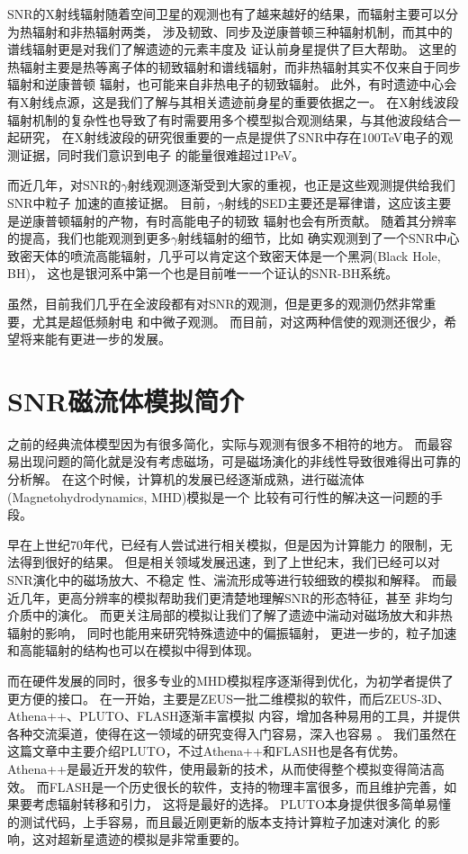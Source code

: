 SNR的X射线辐射随着空间卫星的观测也有了越来越好的结果，而辐射主要可以分为热辐射和非热辐射两类，
涉及韧致、同步及逆康普顿三种辐射机制，而其中的谱线辐射更是对我们了解遗迹的元素丰度及
证认前身星提供了巨大帮助。
这里的热辐射主要是热等离子体的韧致辐射和谱线辐射，而非热辐射其实不仅来自于同步辐射和逆康普顿
辐射，也可能来自非热电子的韧致辐射。
此外，有时遗迹中心会有X射线点源，这是我们了解与其相关遗迹前身星的重要依据之一。
在X射线波段辐射机制的复杂性也导致了有时需要用多个模型拟合观测结果，与其他波段结合一起研究，
在X射线波段的研究很重要的一点是提供了SNR中存在100TeV电子的观测证据，同时我们意识到电子
的能量很难超过1PeV\citep{Reynolds1999}。

而近几年，对SNR的$\gamma$射线观测逐渐受到大家的重视，也正是这些观测提供给我们SNR中粒子
加速的直接证据。
目前，$\gamma$射线的SED主要还是幂律谱，这应该主要是逆康普顿辐射的产物，有时高能电子的韧致
辐射也会有所贡献。
随着其分辨率的提高，我们也能观测到更多$\gamma$射线辐射的细节，比如\citet{Abeysekara2018}
确实观测到了一个SNR中心致密天体的喷流高能辐射，几乎可以肯定这个致密天体是一个黑洞(Black Hole, BH)，
这也是银河系中第一个也是目前唯一一个证认的SNR-BH系统。

虽然，目前我们几乎在全波段都有对SNR的观测，但是更多的观测仍然非常重要，尤其是超低频射电
和中微子观测。
而目前，对这两种信使的观测还很少，希望将来能有更进一步的发展。

\section{SNR磁流体模拟简介}
\label{MHDintro}
之前的经典流体模型因为有很多简化，实际与观测有很多不相符的地方。
而最容易出现问题的简化就是没有考虑磁场，可是磁场演化的非线性导致很难得出可靠的分析解。
在这个时候，计算机的发展已经逐渐成熟，进行磁流体(Magnetohydrodynamics, MHD)模拟是一个
比较有可行性的解决这一问题的手段。

早在上世纪70年代，已经有人尝试进行相关模拟\citep{1978MmSAI..49..513S}，但是因为计算能力
的限制，无法得到很好的结果。
但是相关领域发展迅速，到了上世纪末，我们已经可以对SNR演化中的磁场放大、不稳定
性、湍流形成等进行较细致的模拟和解释\citep{Jun1996, Jun1996a, Jun1999}。
而最近几年，更高分辨率的模拟帮助我们更清楚地理解SNR的形态特征\citep{Orlando2007}，甚至
非均匀介质中的演化\citep{Ferreira2008}。
而更关注局部的模拟让我们了解了遗迹中湍动对磁场放大和非热辐射的影响\citep{Fang2014, Ji2016}，
同时也能用来研究特殊遗迹中的偏振辐射\citep{Schneiter2015, Velazquez2017}，
更进一步的，粒子加速和高能辐射的结构也可以在模拟中得到体现\citep{Yang2015, vanMarle2018}。

而在硬件发展的同时，很多专业的MHD模拟程序逐渐得到优化，为初学者提供了更方便的接口。
在一开始，主要是ZEUS一批二维模拟的软件，而后ZEUS-3D、Athena++、PLUTO、FLASH逐渐丰富模拟
内容，增加各种易用的工具，并提供各种交流渠道，使得在这一领域的研究变得入门容易，深入也容易
\citep{Stone1992b, Stone1992, Stone1992a, White2016, Mignone2007, Mignone2012, Fryxell2000}。
我们虽然在这篇文章中主要介绍PLUTO，不过Athena++和FLASH也是各有优势。
Athena++是最近开发的软件，使用最新的技术，从而使得整个模拟变得简洁高效。
而FLASH是一个历史很长的软件，支持的物理丰富很多，而且维护完善，如果要考虑辐射转移和引力，
这将是最好的选择。
PLUTO本身提供很多简单易懂的测试代码，上手容易，而且最近刚更新的版本支持计算粒子加速对演化
的影响，这对超新星遗迹的模拟是非常重要的。

